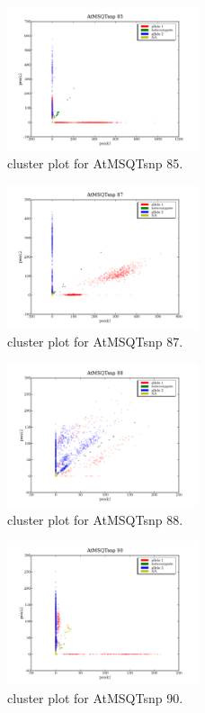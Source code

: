\begin{figure}[H]
\includegraphics[width=0.5\textwidth]{figures/cluster_plot_AtMSQTsnp_85.png}
\caption{cluster plot for AtMSQTsnp 85.} \label{flAtMSQTsnp85}
\end{figure}

\begin{figure}[H]
\includegraphics[width=0.5\textwidth]{figures/cluster_plot_AtMSQTsnp_87.png}
\caption{cluster plot for AtMSQTsnp 87.} \label{flAtMSQTsnp87}
\end{figure}

\begin{figure}[H]
\includegraphics[width=0.5\textwidth]{figures/cluster_plot_AtMSQTsnp_88.png}
\caption{cluster plot for AtMSQTsnp 88.} \label{flAtMSQTsnp88}
\end{figure}

\begin{figure}[H]
\includegraphics[width=0.5\textwidth]{figures/cluster_plot_AtMSQTsnp_90.png}
\caption{cluster plot for AtMSQTsnp 90.} \label{flAtMSQTsnp90}
\end{figure}

